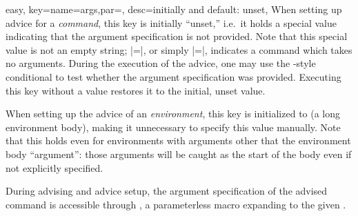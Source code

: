 \documentclass[a4paper,11pt]{article}
\begin{document}
\begin{doc}{easy,
    key={name=args,par=, desc=initially and default: unset},
  }
  When setting up advice for a \emph{command}, this key is initially ``unset,''
  i.e.\ it holds a special value indicating that the argument specification is
  not provided.  Note that this special value is not an empty string;
  |={}|, or simply |=|, indicates a command
  which takes no arguments.  During the execution of the advice, one may use
  the -style conditional  to test whether the argument specification was
  provided.  Executing this key without a value restores it to the initial,
  unset value.
  
  When setting up the advice of an \emph{environment}, this key is
  initialized to  (a long environment body),
  making it unnecessary to specify this value manually.  Note that this holds
  even for environments with arguments other that the environment body
  ``argument'': those arguments will be caught as the start of the body even if
  not explicitly specified.
  
  During advising and advice setup, the argument specification of the advised
  command is accessible through , a parameterless macro
  expanding to the given .
\end{doc}
\end{document}
